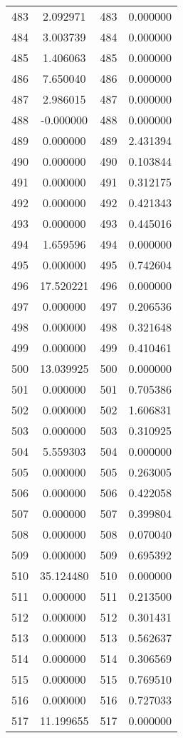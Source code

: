 \documentclass[12pt]{article}
\begin{document}
\begin{longtable}{@{}cccc@{}}
483 & 2.092971 & 483 & 0.000000 \\
484 & 3.003739 & 484 & 0.000000 \\
485 & 1.406063 & 485 & 0.000000 \\
486 & 7.650040 & 486 & 0.000000 \\
487 & 2.986015 & 487 & 0.000000 \\
488 & -0.000000 & 488 & 0.000000 \\
489 & 0.000000 & 489 & 2.431394 \\
490 & 0.000000 & 490 & 0.103844 \\
491 & 0.000000 & 491 & 0.312175 \\
492 & 0.000000 & 492 & 0.421343 \\
493 & 0.000000 & 493 & 0.445016 \\
494 & 1.659596 & 494 & 0.000000 \\
495 & 0.000000 & 495 & 0.742604 \\
496 & 17.520221 & 496 & 0.000000 \\
497 & 0.000000 & 497 & 0.206536 \\
498 & 0.000000 & 498 & 0.321648 \\
499 & 0.000000 & 499 & 0.410461 \\
500 & 13.039925 & 500 & 0.000000 \\
501 & 0.000000 & 501 & 0.705386 \\
502 & 0.000000 & 502 & 1.606831 \\
503 & 0.000000 & 503 & 0.310925 \\
504 & 5.559303 & 504 & 0.000000 \\
505 & 0.000000 & 505 & 0.263005 \\
506 & 0.000000 & 506 & 0.422058 \\
507 & 0.000000 & 507 & 0.399804 \\
508 & 0.000000 & 508 & 0.070040 \\
509 & 0.000000 & 509 & 0.695392 \\
510 & 35.124480 & 510 & 0.000000 \\
511 & 0.000000 & 511 & 0.213500 \\
512 & 0.000000 & 512 & 0.301431 \\
513 & 0.000000 & 513 & 0.562637 \\
514 & 0.000000 & 514 & 0.306569 \\
515 & 0.000000 & 515 & 0.769510 \\
516 & 0.000000 & 516 & 0.727033 \\
517 & 11.199655 & 517 & 0.000000 \\

\end{longtable}
\end{document}
